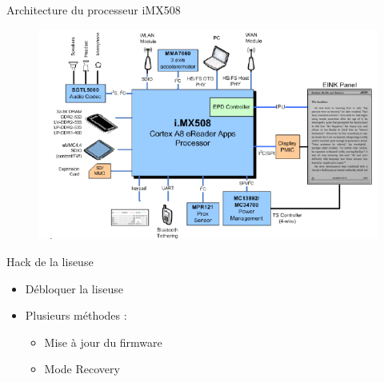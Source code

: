 \begin{frame}{Architecture du processeur iMX508} %
	\begin{figure}
		\begin{center}
			\includegraphics[scale=0.65]{iMX508.png}
		\end{center}
	\end{figure}
\end{frame}

\begin{frame}{Hack de la liseuse}
		\begin{itemize}
			\item{Débloquer la liseuse}
			\item{Plusieurs méthodes :}
			\begin{itemize}
				\item{Mise à jour du firmware}
				\item{Mode Recovery}
			\end{itemize}
		\end{itemize}
\end{frame}
